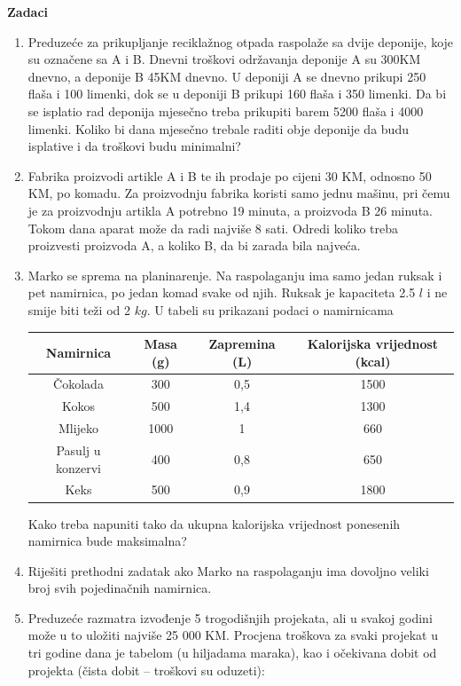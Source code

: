 \documentclass[a4paper, utf8, 11pt, colorlinks]{book}
\begin{document}
\textbf{\large Zadaci}
\begin{enumerate}
	
	\item Preduzeće za prikupljanje reciklažnog otpada raspolaže sa dvije deponije, koje su označene sa A i B. Dnevni troškovi održavanja deponije A su 300KM dnevno, a deponije B 45KM dnevno.  U deponiji A se dnevno prikupi 250 flaša i 100 limenki, dok se u deponiji B prikupi 160 flaša i 350 limenki. Da bi se isplatio rad deponija mjesečno treba prikupiti barem 5200 flaša i 4000 limenki.
	Koliko bi dana mjesečno trebale raditi obje deponije da budu isplative i da troškovi budu minimalni?
	
	\item Fabrika proizvodi artikle A i B te ih prodaje po cijeni 30 KM, odnosno 50 KM, po komadu. Za
	proizvodnju fabrika koristi samo jednu mašinu, pri čemu je za proizvodnju artikla A potrebno 19
	minuta, a proizvoda B 26 minuta. Tokom dana aparat može da radi najviše 8 sati. Odredi koliko treba
	proizvesti proizvoda A, a koliko B, da bi zarada bila najveća.
	
	\item Marko se sprema na planinarenje. Na raspolaganju ima samo jedan ruksak i pet namirnica, po jedan
	komad svake od njih. Ruksak je kapaciteta 2.5 $l$ i ne smije biti teži od 2 $kg$. U tabeli su
	prikazani podaci o namirnicama
	\begin{table}[H]
		\centering
		\begin{tabular}{|c|c|c|c|}
			\hline
			Namirnica & Masa (g) & Zapremina (L) & Kalorijska vrijednost (kcal) \\
			\hline
			Čokolada & 300 & 0,5 & 1500 \\
			\hline
			Kokos & 500 & 1,4 & 1300 \\
			\hline
			Mlijeko& 1000 & 1 & 660 \\
			\hline
			Pasulj u konzervi& 400 & 0,8 & 650 \\
			\hline
			Keks& 500 & 0,9 & 1800 \\
			\hline
		\end{tabular}
	\end{table}
	Kako treba napuniti tako da ukupna kalorijska vrijednost ponesenih namirnica bude maksimalna?
	
	\item Riješiti prethodni zadatak ako Marko na raspolaganju ima dovoljno veliki broj svih pojedinačnih namirnica.
	
	
	\item Preduzeće  razmatra izvođenje 5 trogodišnjih projekata, ali u svakoj godini može u to uložiti najviše
	25 000 KM. Procjena troškova za svaki projekat u tri godine dana je tabelom (u hiljadama maraka), kao i
	očekivana dobit od projekta (čista dobit – troškovi su oduzeti):


\end{enumerate}
\end{document}
